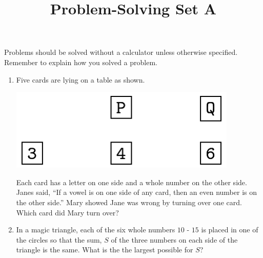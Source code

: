 \documentclass{article}
\title{Problem-Solving Set A}
\author{}
\date{}
\begin{document}
\maketitle
\noindent Problems should be solved without a calculator unless otherwise specified.
Remember to explain how you solved a problem.
\begin{multicols*}{2}
    \begin{enumerate}
        \item Five cards are lying on a table as shown.
            \begin{center}
                \includegraphics[scale=0.25]{5-2_cards.png}
            \end{center}
            Each card has a letter on one side and a whole number on the other side.
            Janes said, ``If a vowel is on one side of any card, then an even number is on the other side.''
            Mary showed Jane was wrong by turning over one card.
            Which card did Mary turn over?
            \vspace{3cm}
        \item In a magic triangle, each of the six whole numbers $10$ - $15$ is placed in one of the circles so that the sum, $S$ of the three numbers on each side of the triangle is the same.
            What is the the largest possible for $S$?
            \begin{center}
\end{center}
\end{enumerate}
\end{multicols*}
\end{document}
